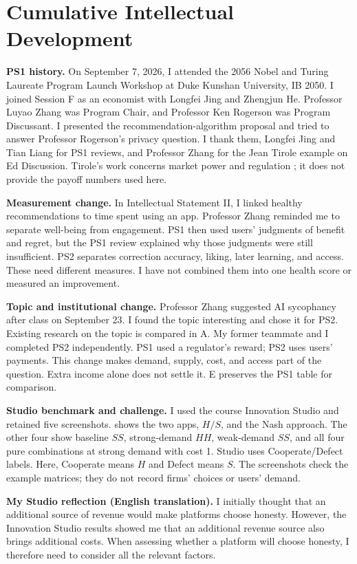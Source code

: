 \section{Cumulative Intellectual Development}
\textbf{PS1 history.} On September 7, 2026, I attended the 2056 Nobel and Turing Laureate Program Launch Workshop at Duke Kunshan University, IB 2050. I joined Session F as an economist with Longfei Jing and Zhengjun He. Professor Luyao Zhang was Program Chair, and Professor Ken Rogerson was Program Discussant. I presented the recommendation-algorithm proposal and tried to answer Professor Rogerson's privacy question. I thank them, Longfei Jing and Tian Liang for PS1 reviews, and Professor Zhang for the Jean Tirole example on Ed Discussion. Tirole's work concerns market power and regulation \cite{nobel2014}; it does not provide the payoff numbers used here.

\textbf{Measurement change.} In Intellectual Statement II, I linked healthy recommendations to time spent using an app. Professor Zhang reminded me to separate well-being from engagement. PS1 then used users' judgments of benefit and regret, but the PS1 review explained why those judgments were still insufficient. PS2 separates correction accuracy, liking, later learning, and access. These need different measures. I have not combined them into one health score or measured an improvement.

\textbf{Topic and institutional change.} Professor Zhang suggested AI sycophancy after class on September 23. I found the topic interesting and chose it for PS2. Existing research on the topic is compared in A. My former teammate and I completed PS2 independently. PS1 used a regulator's reward; PS2 uses users' payments. This change makes demand, supply, cost, and access part of the question. Extra income alone does not settle it. E preserves the PS1 table for comparison.

\textbf{Studio benchmark and challenge.} I used the course Innovation Studio \cite{studio2026} and retained five screenshots.  shows the two apps, $H/S$, and the Nash approach. The other four show baseline $SS$, strong-demand $HH$, weak-demand $SS$, and all four pure combinations at strong demand with cost 1. Studio uses Cooperate/Defect labels. Here, Cooperate means $H$ and Defect means $S$. The screenshots check the example matrices; they do not record firms' choices or users' demand.

\textbf{My Studio reflection (English translation).} I initially thought that an additional source of revenue would make platforms choose honesty. However, the Innovation Studio results showed me that an additional revenue source also brings additional costs. When assessing whether a platform will choose honesty, I therefore need to consider all the relevant factors.

